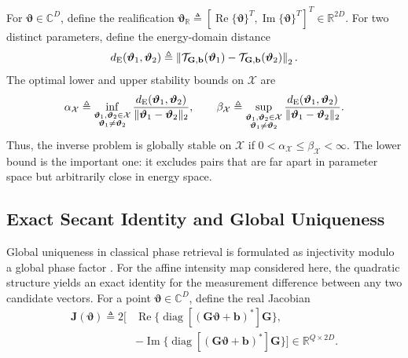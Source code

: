 \documentclass[journal]{IEEEtran}
\begin{document}
For $\boldsymbol\vartheta\in\mathbb C^D$, define the realification
$\boldsymbol\vartheta_{\mathbb R}\triangleq[\operatorname{Re}\{\boldsymbol\vartheta\}^T,
\operatorname{Im}\{\boldsymbol\vartheta\}^T]^T\in\mathbb R^{2D}$. For two
distinct parameters, define the energy-domain distance
\begin{equation}
d_{\rm E}(\boldsymbol\vartheta_1,\boldsymbol\vartheta_2)
\triangleq
\left\|
\mathcal T_{\mathbf G,\mathbf b}(\boldsymbol\vartheta_1)
-
\mathcal T_{\mathbf G,\mathbf b}(\boldsymbol\vartheta_2)
\right\|_2 .
\label{eq:energy_domain_distance_general}
\end{equation}
The optimal lower and upper stability bounds on $\mathcal X$ are
\begin{equation}
\alpha_{\mathcal X}
\triangleq
\inf_{\substack{\boldsymbol\vartheta_1,\boldsymbol\vartheta_2\in\mathcal X\\
\boldsymbol\vartheta_1\ne\boldsymbol\vartheta_2}}
\frac{d_{\rm E}(\boldsymbol\vartheta_1,\boldsymbol\vartheta_2)}
{\|\boldsymbol\vartheta_1-\boldsymbol\vartheta_2\|_2},
\qquad
\beta_{\mathcal X}
\triangleq
\sup_{\substack{\boldsymbol\vartheta_1,\boldsymbol\vartheta_2\in\mathcal X\\
\boldsymbol\vartheta_1\ne\boldsymbol\vartheta_2}}
\frac{d_{\rm E}(\boldsymbol\vartheta_1,\boldsymbol\vartheta_2)}
{\|\boldsymbol\vartheta_1-\boldsymbol\vartheta_2\|_2}.
\label{eq:stability_constants}
\end{equation}
Thus, the inverse problem is globally stable on $\mathcal X$ if
$0<\alpha_{\mathcal X}\leq\beta_{\mathcal X}<\infty$.  The lower bound is the
important one: it excludes pairs that are far apart in parameter space but
arbitrarily close in energy space.

\subsection{Exact Secant Identity and Global Uniqueness}

Global uniqueness in classical phase retrieval is formulated as
injectivity modulo a global phase factor
\cite{balan2006signal,bandeira2014saving,conca2015algebraic}.
For the affine intensity map considered here, the quadratic
structure yields an exact identity for the measurement difference
between any two candidate vectors. For a point
$\boldsymbol\vartheta\in\mathbb C^D$, define the real Jacobian
\begin{equation}
\begin{split}
\mathbf J(\boldsymbol\vartheta)
\triangleq 2\big[&
\operatorname{Re}\{\operatorname{diag}[
(\mathbf G\boldsymbol\vartheta+\mathbf b)^*]\mathbf G\},\\
&-\operatorname{Im}\{\operatorname{diag}[
(\mathbf G\boldsymbol\vartheta+\mathbf b)^*]\mathbf G\}
\big]\in\mathbb R^{Q\times 2D}.
\end{split}
\label{eq:real_jacobian}
\end{equation}
\end{document}

